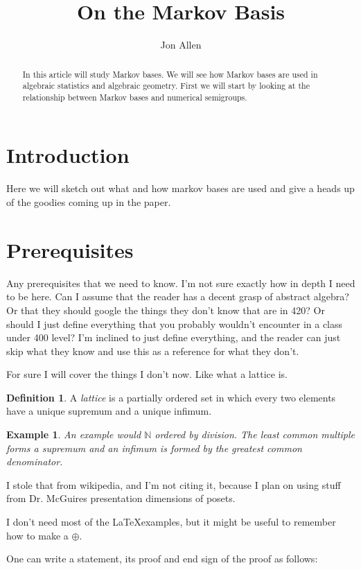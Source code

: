 \documentclass[11pt]{amsart}
\theoremstyle{plain}
\newtheorem{exa}{Example}
\theoremstyle{definition}
\newtheorem*{defi}{Definition}
\begin{document}
\title{On the Markov Basis}
\author{Jon Allen}
\begin{abstract}
In this article will study Markov bases. We will see how Markov bases are used in algebraic statistics and algebraic geometry. First we will start by looking at the relationship between Markov bases and numerical semigroups.
\end{abstract}
\maketitle
\section{Introduction}
Here we will sketch out what and how markov bases are used and give a heads up of the goodies coming up in the paper.
\section{Prerequisites}
Any prerequisites that we need to know. I'm not sure exactly how in depth I need to be here. Can I assume that the reader has a decent grasp of abstract algebra? Or that they should google the things they don't know that are in 420? Or should I just define everything that you probably wouldn't encounter in a class under 400 level?
I'm inclined to just define everything, and the reader can just skip what they know and use this as a reference for what they don't.

For sure I will cover the things I don't now. Like what a lattice is.
\begin{defi}
A \emph{lattice} is a partially ordered set in which every two elements have a unique supremum and a unique infimum.
\end{defi}
\begin{exa}
An example would $\mathbb{N}$ ordered by division. The least common multiple forms a supremum and an infimum is formed by the greatest common denominator.
\end{exa}
I stole that from wikipedia, and I'm not citing it, because I plan on using stuff from Dr. McGuires presentation dimensions of posets.

I don't need most of the \LaTeX examples, but it might be useful to remember how to make a $\oplus$.

One can write a statement, its proof and end sign of the proof as follows:
\end{document}
